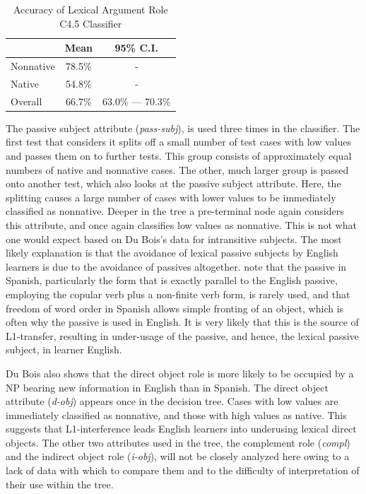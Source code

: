 \documentclass[main.tex]{subfiles}
\begin{document}
\FloatBarrier
\begin{table}[ht]
\centering
\caption{Accuracy of Lexical Argument Role C4.5 Classifier}
\begin{tabular}{l c c}
\toprule
& Mean & 95\% C.I.\\
\midrule
Nonnative & 78.5\% & - \\
[6pt]Native & 54.8\% & - \\
[6pt]Overall & 66.7\% & 63.0\% --- 70.3\% \\
\bottomrule
\end{tabular}
\label{table:lex-role-results}
\end{table}


The passive subject attribute (\textit{pass-subj}), is used three times in the classifier. The first test that considers it splits off a small number of test cases with low values and passes them on to further tests. This group consists of approximately equal numbers of native and nonnative cases. The other, much larger group is passed onto another test, which also looks at the passive subject attribute. Here, the splitting causes a large number of cases with lower values to be immediately classified as nonnative. Deeper in the tree a pre-terminal node again considers this attribute, and once again classifies low values as nonnative. This is not what one would expect based on Du Bois's data for intransitive subjects. The most likely explanation is that the avoidance of lexical passive subjects by English learners is due to the avoidance of passives altogether. \citet[28.2.3]{butt} note that the passive in Spanish, particularly the form that is exactly parallel to the English passive, employing the copular verb plus a non-finite verb form, is rarely used, and that freedom of word order in Spanish allows simple fronting of an object, which is often why the passive is used in English. It is very likely that this is the source of L1-transfer, resulting in under-usage of the passive, and hence, the lexical passive subject, in learner English.

Du Bois also shows that the direct object role is more likely to be occupied by a NP bearing new information in English than in Spanish. The direct object attribute (\textit{d-obj}) appears once in the decision tree. Cases with low values are immediately classified as nonnative, and those with high values as native. This suggests that L1-interference leads English learners into underusing lexical direct objects. The other two attributes used in the tree, the complement role (\textit{compl}) and the indirect object role (\textit{i-obj}), will not be closely analyzed here owing to a lack of data with which to compare them and to the difficulty of interpretation of their use within the tree.
\end{document}
